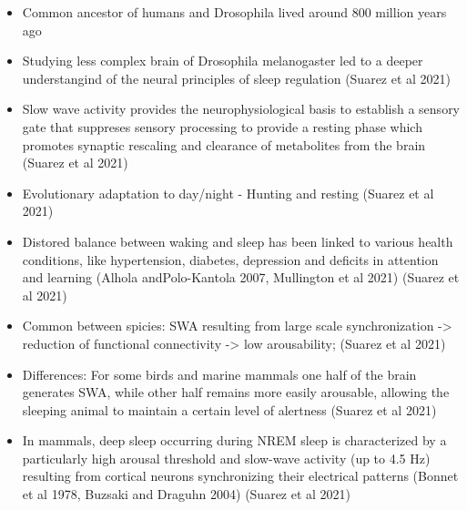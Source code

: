\documentclass[11pt]{article}
\begin{document}
\begin{itemize}
    \item Common ancestor of humans and Drosophila lived around 800 million
    years ago \cite{williamsLongReachNAAG2021}

    \item Studying less complex brain of
    Drosophila melanogaster led to a deeper understangind of the neural
    principles of sleep regulation \cite{suarez-grimaltNeuralArchitectureSleep2021}
    (Suarez et al 2021)

    \item Slow wave activity provides the neurophysiological basis to establish a
    sensory gate that suppreses sensory processing to
    provide a resting phase which promotes synaptic rescaling and
    clearance of metabolites from the brain \cite{suarez-grimaltNeuralArchitectureSleep2021}
    (Suarez et al 2021)
    \item Evolutionary adaptation to day/night - Hunting and resting \cite{suarez-grimaltNeuralArchitectureSleep2021}
    (Suarez et al 2021)

    \item Distored balance between waking and sleep has been linked to various
    health conditions, like hypertension, diabetes, depression and deficits in
    attention and learning (Alhola andPolo-Kantola 2007, Mullington et al 2021)
    \cite{suarez-grimaltNeuralArchitectureSleep2021}
    (Suarez et al 2021)

    \item Common between spicies: SWA resulting from large scale synchronization
    -> reduction of functional connectivity -> low arousability;
    \cite{suarez-grimaltNeuralArchitectureSleep2021}
    (Suarez et al 2021)

    \item Differences: For some birds and marine mammals one half of the brain
    generates SWA, while other half remains more easily arousable, allowing
    the sleeping animal to maintain a certain level of alertness \cite{suarez-grimaltNeuralArchitectureSleep2021}
    (Suarez et al 2021)

    \item In mammals, deep sleep occurring during NREM sleep is characterized
    by a particularly high arousal threshold and slow-wave activity (up to 4.5 Hz)
    resulting from cortical neurons synchronizing their electrical patterns (Bonnet et al 1978,
    Buzsaki and Draguhn 2004) \cite{suarez-grimaltNeuralArchitectureSleep2021}
    (Suarez et al 2021)


\end{itemize}
\end{document}
